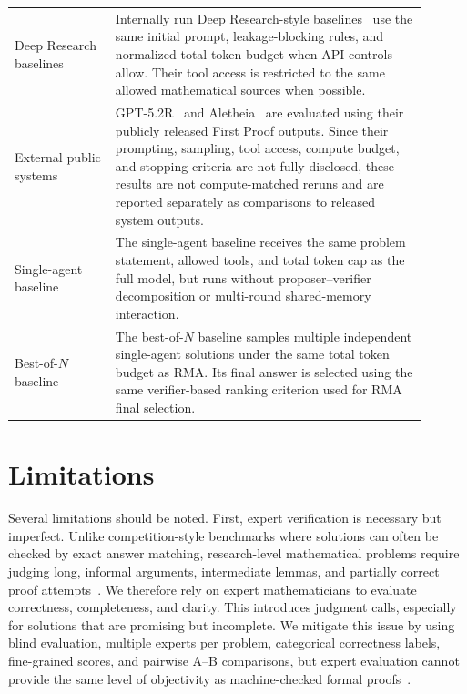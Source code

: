 \documentclass{article}
\begin{document}
\begin{table}[t]
\begin{tabular}{p{0.22\linewidth} p{0.68\linewidth}}
Deep Research baselines
& Internally run Deep Research-style baselines~\citep{openai_deep_research_2025,google_gemini_deep_research_2025} use the same initial prompt, leakage-blocking rules, and normalized total token budget when API controls allow. Their tool access is restricted to the same allowed mathematical sources when possible. \\

External public systems
& GPT-5.2R~\citep{openai_first_proof_2025} and Aletheia~\citep{aletheia} are evaluated using their publicly released First Proof outputs. Since their prompting, sampling, tool access, compute budget, and stopping criteria are not fully disclosed, these results are not compute-matched reruns and are reported separately as comparisons to released system outputs. \\

Single-agent baseline
& The single-agent baseline receives the same problem statement, allowed tools, and total token cap as the full model, but runs without proposer--verifier decomposition or multi-round shared-memory interaction. \\

Best-of-$N$ baseline
& The best-of-$N$ baseline samples multiple independent single-agent solutions under the same total token budget as RMA. Its final answer is selected using the same verifier-based ranking criterion used for RMA final selection. \\


\bottomrule
\end{tabular}
\vspace{-2mm}
\end{table}

\section{Limitations}
\label{app-limitations}

Several limitations should be noted. First, expert verification is necessary but imperfect. Unlike competition-style benchmarks where solutions can often be checked by exact answer matching, research-level mathematical problems require judging long, informal arguments, intermediate lemmas, and partially correct proof attempts~\citep{abouzaid2026first}. We therefore rely on expert mathematicians to evaluate correctness, completeness, and clarity. This introduces judgment calls, especially for solutions that are promising but incomplete. We mitigate this issue by using blind evaluation, multiple experts per problem, categorical correctness labels, fine-grained scores, and pairwise A--B comparisons, but expert evaluation cannot provide the same level of objectivity as machine-checked formal proofs~\citep{yang2023leandojo,Lean4}.
\end{document}

